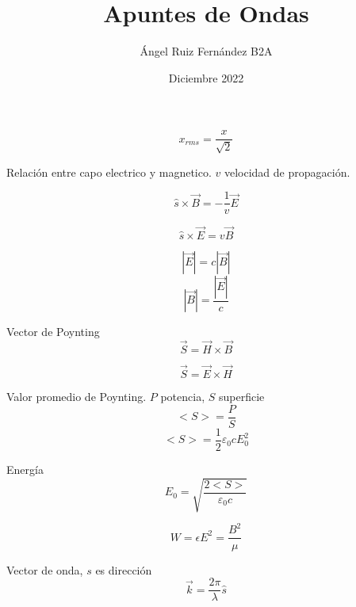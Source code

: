 \documentclass[12pt, letterpaper, twoside]{article}
\title{Apuntes de Ondas}
\author{Ángel Ruiz Fernández B2A}
\date{Diciembre 2022}
\begin{document}
	\maketitle
	
	\begin{equation}
		x_{rms} = \frac{x}{\sqrt{2}}
	\end{equation}
	
	Relación entre capo electrico y magnetico. $v$ velocidad de propagación. 
	
	\begin{equation}
		\hat{s} \times \vec{B} = - \frac{1}{v} \vec{E}
	\end{equation}

	\begin{equation}
		\hat{s} \times \vec{E} = v \vec{B}
	\end{equation}

	\begin{equation}
		|\vec{E}| = c|\vec{B}|
	\end{equation}
	\begin{equation}
		|\vec{B}| = \frac{|\vec{E}|}{c}
	\end{equation}

	Vector de Poynting
	\begin{equation}
		\vec{S} = \vec{H} \times \vec{B}
	\end{equation}

	\begin{equation}
		\vec{S} = \vec{E} \times \vec{H}
	\end{equation}

	Valor promedio de Poynting. $P$ potencia, $S$ superficie
	\begin{equation}
		<S> = \frac{P}{S}
	\end{equation}
	\begin{equation}
		<S> = \frac{1}{2} \varepsilon_0 c E^2_0
	\end{equation}

	Energía
	\begin{equation}
		E_0 = \sqrt{\frac{2<S>}{\varepsilon_0 c}}
	\end{equation}

	\begin{equation}
		W = \epsilon E^2  = \frac{B^2}{\mu}
	\end{equation}

	Vector de onda, $s$ es dirección
	\begin{equation}
		\vec{k} = \frac{2 \pi}{\lambda} \hat{s}
	\end{equation}
\end{document}

